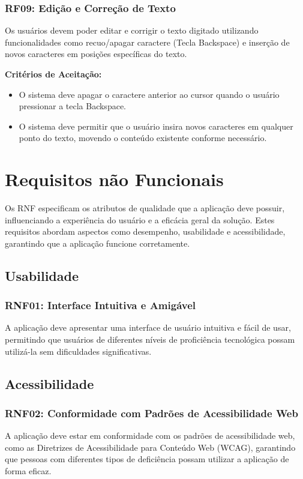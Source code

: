 \subsubsection{\gls{RF}09: Edição e Correção de Texto}
Os usuários devem poder editar e corrigir o texto digitado utilizando funcionalidades como recuo/apagar caractere (Tecla Backspace) e inserção de novos caracteres em posições específicas do texto.

\textbf{Critérios de Aceitação:}
\begin{itemize}
    \item O sistema deve apagar o caractere anterior ao cursor quando o usuário pressionar a tecla Backspace.
    \item O sistema deve permitir que o usuário insira novos caracteres em qualquer ponto do texto, movendo o conteúdo existente conforme necessário.
\end{itemize}

\section{Requisitos não Funcionais}

Os \gls{RNF} especificam os atributos de qualidade que a aplicação deve possuir, influenciando a experiência do usuário e a eficácia geral da solução. Estes requisitos abordam aspectos como desempenho, usabilidade e acessibilidade, garantindo que a aplicação funcione corretamente.


\subsection{Usabilidade}

\subsubsection{\gls{RNF}01: Interface Intuitiva e Amigável}
A aplicação deve apresentar uma interface de usuário intuitiva e fácil de usar, permitindo que usuários de diferentes níveis de proficiência tecnológica possam utilizá-la sem dificuldades significativas.

\subsection{Acessibilidade}

\subsubsection{\gls{RNF}02: Conformidade com Padrões de Acessibilidade Web}
A aplicação deve estar em conformidade com os padrões de acessibilidade web, como as Diretrizes de Acessibilidade para Conteúdo Web (WCAG), garantindo que pessoas com diferentes tipos de deficiência possam utilizar a aplicação de forma eficaz.

